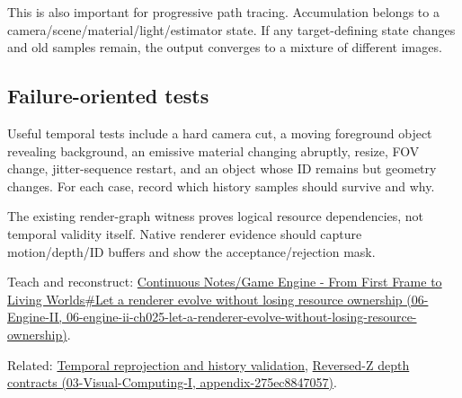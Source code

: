 This is also important for progressive path tracing. Accumulation belongs to a camera/scene/material/light/estimator state. If any target-defining state changes and old samples remain, the output converges to a mixture of different images.

\subsection{Failure-oriented tests}\label{appendix-2e7e9fd28a2c-failure-oriented-tests}

Useful temporal tests include a hard camera cut, a moving foreground object revealing background, an emissive material changing abruptly, resize, FOV change, jitter-sequence restart, and an object whose ID remains but geometry changes. For each case, record which history samples should survive and why.

The existing render-graph witness proves logical resource dependencies, not temporal validity itself. Native renderer evidence should capture motion/depth/ID buffers and show the acceptance/rejection mask.

Teach and reconstruct: \href{../06-Engine-II/main.pdf\#nameddest=06-engine-ii-ch025-let-a-renderer-evolve-without-losing-resource-ownership}{Continuous Notes/Game Engine - From First Frame to Living Worlds\#Let a renderer evolve without losing resource ownership (06-Engine-II, 06-engine-ii-ch025-let-a-renderer-evolve-without-losing-resource-ownership)}.

Related: \hyperref[appendix-0727340a4428]{Temporal reprojection and history validation}, \href{../03-Visual-Computing-I/main.pdf\#nameddest=appendix-275ec8847057}{Reversed-Z depth contracts (03-Visual-Computing-I, appendix-275ec8847057)}.
